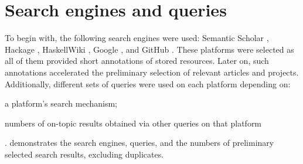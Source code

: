\section{Search engines and queries} \label{sec:searchProcess}
To begin with, the following search engines were used: Semantic Scholar \cite{noauthor_semantic_nodate}, Hackage \cite{noauthor_packages_nodate}, HaskellWiki \cite{noauthor_haskellwiki_nodate}, Google \cite{noauthor_google_nodate-1}, and GitHub \cite {noauthor_build_nodate}. These platforms were selected as all of them provided short annotations of stored resources. Later on, such annotations accelerated the preliminary selection of relevant articles and projects. Additionally, different sets of queries were used on each platform depending on:
\begin{enumerate*}[ label=\arabic*) ]
    \item a platform's search mechanism;
    \item numbers of on-topic results obtained via other queries on that platform
\end{enumerate*}.
 demonstrates the search engines, queries, and the numbers of preliminary selected search results, excluding duplicates.

\newcommand{\centeredHeader}[1]{\multicolumn{1}{|c|}{\textbf{#1}}}


